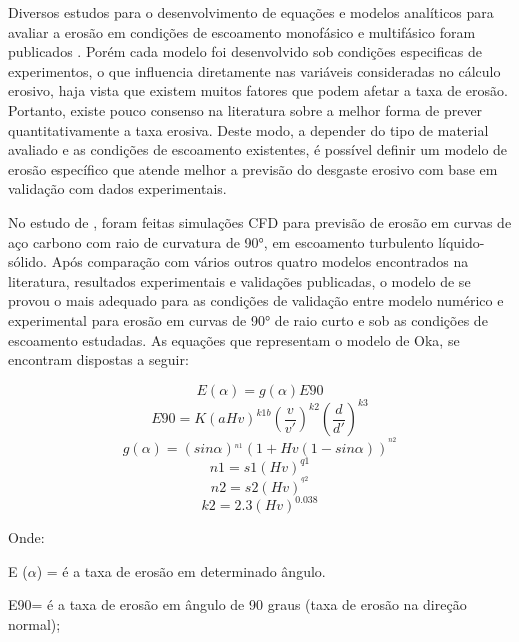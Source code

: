 Diversos estudos para o desenvolvimento de equações e modelos analíticos para avaliar a erosão em condições de escoamento monofásico e multifásico foram publicados \cite {oka} \cite {dnv} \cite {finnie} \cite{maclaury}. Porém cada modelo foi desenvolvido sob condições especificas de experimentos, o que influencia diretamente nas variáveis consideradas no cálculo erosivo, haja vista que existem muitos fatores que podem afetar a taxa de erosão. Portanto, existe pouco consenso na literatura sobre a melhor forma de prever quantitativamente a taxa erosiva. Deste modo, a depender do tipo de material avaliado e as condições de escoamento existentes, é possível definir um modelo de erosão específico que atende melhor a previsão do desgaste erosivo com base em validação com dados experimentais.

No estudo de , foram feitas simulações CFD para previsão de erosão em curvas de aço carbono com raio de curvatura de 90°, em escoamento turbulento líquido-sólido. Após comparação com vários outros quatro modelos encontrados na literatura, resultados experimentais e validações publicadas, o modelo de  se provou o mais adequado para as condições de validação entre modelo numérico e experimental para erosão em curvas de 90° de raio curto e sob as condições de escoamento estudadas. As equações que representam o modelo de Oka, se encontram dispostas a seguir: 

\begin{equation}
    E(\alpha) = g(\alpha)E90
    \label{equationoka}
\end{equation}
\begin{equation}
E90=K(aHv)^{k1b}  \left ( \frac{v}{v'} \right )^{k2} \left ( \frac{d}{d'} \right )^{k3} 
\end{equation}
\begin{equation}
g(\alpha)= (sin   \alpha)^{_{n1}}(1+Hv(1-sin  \alpha))^{^{n2}}
\end{equation}
\begin{equation}
n1=s1(Hv)^{q1}
\end{equation}
\begin{equation}
n2=s2(Hv)^{^{q2}} 
\end{equation}
\begin{equation}
k2=2.3(Hv)^{0.038} 
\end{equation}

Onde: 

E ($\alpha$) = é a taxa de erosão em determinado ângulo.

E90= é a taxa de erosão em ângulo de 90 graus (taxa de erosão na direção normal); 


